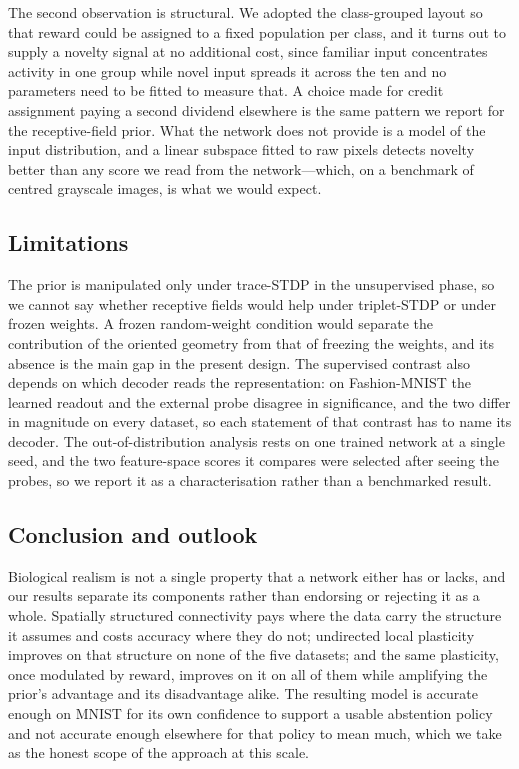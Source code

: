 The second observation is structural. We adopted the class-grouped layout so that reward
could be assigned to a fixed population per class, and it turns out to supply a novelty
signal at no additional cost, since familiar input concentrates activity in one group
while novel input spreads it across the ten and no parameters need to be fitted to
measure that. A choice made for credit assignment paying a second dividend elsewhere is
the same pattern we report for the receptive-field prior. What the network does not
provide is a model of the input distribution, and a linear subspace fitted to raw pixels
detects novelty better than any score we read from the network---which, on a benchmark of
centred grayscale images, is what we would expect.

\subsection{Limitations}

The prior is manipulated only under trace-STDP in the unsupervised phase, so we cannot
say whether receptive fields would help under triplet-STDP or under frozen weights. A
frozen random-weight condition would separate the contribution of the oriented geometry
from that of freezing the weights, and its absence is the main gap in the present design.
The supervised contrast also depends on which decoder reads the representation: on
Fashion-MNIST the learned readout and the external probe disagree in significance, and
the two differ in magnitude on every dataset, so each statement of that contrast has to
name its decoder. The out-of-distribution analysis rests on one trained network at a
single seed, and the two feature-space scores it compares were selected after seeing the
probes, so we report it as a characterisation rather than a benchmarked result.

\subsection{Conclusion and outlook}

Biological realism is not a single property that a network either has or lacks, and our
results separate its components rather than endorsing or rejecting it as a whole.
Spatially structured connectivity pays where the data carry the structure it assumes and
costs accuracy where they do not; undirected local plasticity improves on that structure
on none of the five datasets; and the same plasticity, once modulated by reward, improves
on it on all of them while amplifying the prior's advantage and its disadvantage alike.
The resulting model is accurate enough on MNIST for its own confidence to support a
usable abstention policy and not accurate enough elsewhere for that policy to mean much,
which we take as the honest scope of the approach at this scale.

